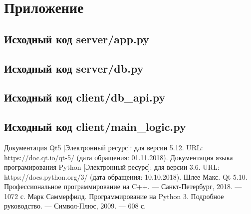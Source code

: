 \documentclass[14pt,a4paper,openbib]{extarticle}
\numberwithin{equation}{section}
\begin{document}
\newpage
\section{Приложение}
\subsection{Исходный код server/app.py}



\newpage
\subsection{Исходный код server/db.py}



% 


\newpage
\subsection{Исходный код client/db\_api.py}



\newpage
\subsection{Исходный код client/main\_logic.py}



\newpage
{}
\begin{thebibliography}{}
\bibitem{}
Документация Qt5 [Электронный ресурс]: для версии 5.12. URL: https://doc.qt.io/qt-5/ (дата обращения: 01.11.2018).
\bibitem{}
Документация языка програмирования Python [Электронный ресурс]: для версии 3.6. URL: https://docs.python.org/3/ (дата обращения: 10.10.2018).
\bibitem{}
Шлее Макс. Qt 5.10. Профессиональное программирование на C++. --- Санкт-Петербург, 2018. --- 1072 с.
\bibitem{}
Марк Саммерфилд. Программирование на Python 3. Подробное руководство. --- Символ-Плюс, 2009. --- 608 с.
\end{thebibliography}
\end{document}
